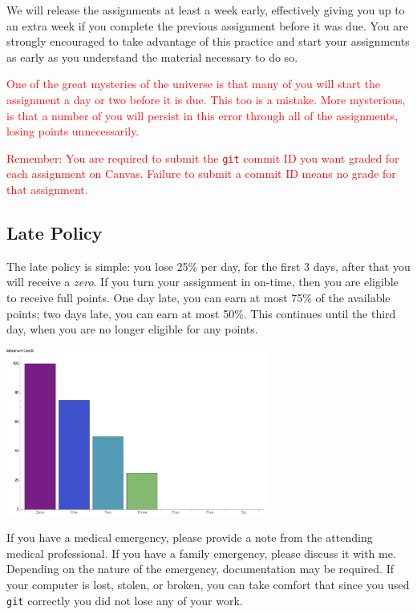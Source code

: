 \documentclass{article}
\begin{document}
We will release the assignments at least a week early, effectively giving you up
to an extra week if you complete the previous assignment before it was due. You
are strongly encouraged to take advantage of this practice and start your
assignments as early as you understand the material necessary to do so.

\textcolor{red}{One of the great mysteries of the universe is that many of you
will start the assignment a day or two before it is due. This too is a mistake.
More mysterious, is that a number of you will persist in this error through all
of the assignments, losing points unnecessarily.}

\textcolor{red}{Remember: You are required to submit the \texttt{git} commit ID
you want graded for each assignment on Canvas. Failure to submit a commit ID
means no grade for that assignment.}

\subsection{Late Policy}

The late policy is simple: you lose 25\% per day, for the first 3 days, after
that you will receive a \emph{zero}. If you turn your assignment in on-time,
then you are eligible to receive full points. One day late, you can earn at most
75\% of the available points; two days late, you can earn at most 50\%. This
continues until the third day, when you are no longer eligible for any points.

\centerline{\includegraphics[width=0.65\textwidth]{images/tardiness.pdf}}

If you have a medical emergency, please provide a note from the attending
medical professional. If you have a family emergency, please discuss it with me.
Depending on the nature of the emergency, documentation may be required. If your
computer is lost, stolen, or broken, you can take comfort that since you used
\texttt{git} correctly you did not lose any of your work.
\end{document}
